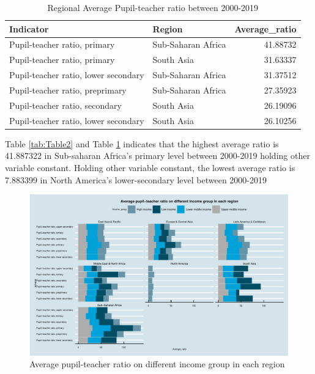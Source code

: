 \documentclass[11pt,a4paper,]{article}
\begin{document}
\begin{table}[H]

\caption{\label{tab:Table3}Regional Average Pupil-teacher ratio between 2000-2019}
\centering
\begin{tabular}[t]{l|l|r}
\hline
Indicator & Region & Average\_ratio\\
\hline
Pupil-teacher ratio, primary & Sub-Saharan Africa & 41.88732\\
\hline
Pupil-teacher ratio, primary & South Asia & 31.63337\\
\hline
Pupil-teacher ratio, lower secondary & Sub-Saharan Africa & 31.37512\\
\hline
Pupil-teacher ratio, preprimary & Sub-Saharan Africa & 27.35923\\
\hline
Pupil-teacher ratio, secondary & South Asia & 26.19096\\
\hline
Pupil-teacher ratio, lower secondary & South Asia & 26.10256\\
\hline
\end{tabular}
\end{table}

Table \ref{tab:Table2} and Table \ref{tab:Table3} indicates that the highest average ratio is 41.887322 in Sub-saharan Africa's primary level between 2000-2019 holding other variable constant. Holding other variable constant, the lowest average ratio is 7.883399 in North America's lower-secondary level between 2000-2019

\begin{figure}
\centering
\includegraphics{report_files/figure-latex/Plot2-1.pdf}
\caption{\label{fig:Plot2}Average pupil-teacher ratio on different income group in each region}
\end{figure}
\end{document}
